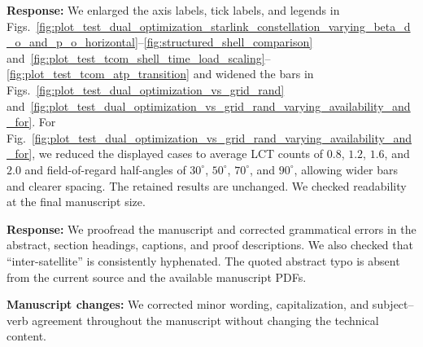 \documentclass[journal,12pt,onecolumn,draftclsnofoot,]{IEEEtran}
\begin{document}

\textbf{Response:} We enlarged the axis labels, tick labels, and legends in Figs.~\ref{fig:plot_test_dual_optimization_starlink_constellation_varying_beta_d_o_and_p_o_horizontal}--\ref{fig:structured_shell_comparison} and~\ref{fig:plot_test_tcom_shell_time_load_scaling}--\ref{fig:plot_test_tcom_atp_transition} and widened the bars in Figs.~\ref{fig:plot_test_dual_optimization_vs_grid_rand} and~\ref{fig:plot_test_dual_optimization_vs_grid_rand_varying_availability_and_for}. For Fig.~\ref{fig:plot_test_dual_optimization_vs_grid_rand_varying_availability_and_for}, we reduced the displayed cases to average LCT counts of $0.8$, $1.2$, $1.6$, and $2.0$ and field-of-regard half-angles of $30^\circ$, $50^\circ$, $70^\circ$, and $90^\circ$, allowing wider bars and clearer spacing. The retained results are unchanged. We checked readability at the final manuscript size.


\textbf{Response:} We proofread the manuscript and corrected grammatical errors in the abstract, section headings, captions, and proof descriptions. We also checked that ``inter-satellite'' is consistently hyphenated. The quoted abstract typo is absent from the current source and the available manuscript PDFs.

\textbf{Manuscript changes:} We corrected minor wording, capitalization, and subject--verb agreement throughout the manuscript without changing the technical content.

\end{document}
